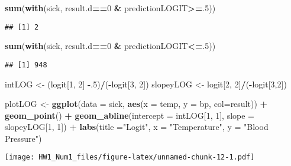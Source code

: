 \documentclass[]{article}
\newenvironment{Shaded}{\begin{snugshade}}{\end{snugshade}}
\newcommand{\KeywordTok}[1]{\textcolor[rgb]{0.13,0.29,0.53}{\textbf{#1}}}
\newcommand{\DataTypeTok}[1]{\textcolor[rgb]{0.13,0.29,0.53}{#1}}
\newcommand{\DecValTok}[1]{\textcolor[rgb]{0.00,0.00,0.81}{#1}}
\newcommand{\StringTok}[1]{\textcolor[rgb]{0.31,0.60,0.02}{#1}}
\newcommand{\OperatorTok}[1]{\textcolor[rgb]{0.81,0.36,0.00}{\textbf{#1}}}
\newcommand{\NormalTok}[1]{#1}
\begin{document}
\begin{Shaded}
\begin{Highlighting}[]
\KeywordTok{sum}\NormalTok{(}\KeywordTok{with}\NormalTok{(sick, result.d}\OperatorTok{==}\DecValTok{0} \OperatorTok{&}\StringTok{ }\NormalTok{predictionLOGIT}\OperatorTok{>=}\NormalTok{.}\DecValTok{5}\NormalTok{))}
\end{Highlighting}
\end{Shaded}

\begin{verbatim}
## [1] 2
\end{verbatim}

\begin{Shaded}
\begin{Highlighting}[]
\KeywordTok{sum}\NormalTok{(}\KeywordTok{with}\NormalTok{(sick, result.d}\OperatorTok{==}\DecValTok{0} \OperatorTok{&}\StringTok{ }\NormalTok{predictionLOGIT}\OperatorTok{<=}\NormalTok{.}\DecValTok{5}\NormalTok{))}
\end{Highlighting}
\end{Shaded}

\begin{verbatim}
## [1] 948
\end{verbatim}

\begin{Shaded}
\begin{Highlighting}[]
\NormalTok{intLOG <-}\StringTok{ }\NormalTok{(logit[}\DecValTok{1}\NormalTok{, }\DecValTok{2}\NormalTok{] }\OperatorTok{-}\NormalTok{.}\DecValTok{5}\NormalTok{)}\OperatorTok{/}\NormalTok{(}\OperatorTok{-}\NormalTok{logit[}\DecValTok{3}\NormalTok{, }\DecValTok{2}\NormalTok{]) }
\NormalTok{slopeyLOG <-}\StringTok{ }\NormalTok{logit[}\DecValTok{2}\NormalTok{, }\DecValTok{2}\NormalTok{]}\OperatorTok{/}\NormalTok{(}\OperatorTok{-}\NormalTok{logit[}\DecValTok{3}\NormalTok{,}\DecValTok{2}\NormalTok{])}
\end{Highlighting}
\end{Shaded}

\begin{Shaded}
\begin{Highlighting}[]
\NormalTok{plotLOG <-}\StringTok{ }\KeywordTok{ggplot}\NormalTok{(}\DataTypeTok{data =}\NormalTok{ sick, }\KeywordTok{aes}\NormalTok{(}\DataTypeTok{x =}\NormalTok{ temp, }\DataTypeTok{y =}\NormalTok{ bp, }\DataTypeTok{col=}\NormalTok{result)) }\OperatorTok{+}\StringTok{ }\KeywordTok{geom_point}\NormalTok{() }\OperatorTok{+}\StringTok{ }\KeywordTok{geom_abline}\NormalTok{(}\DataTypeTok{intercept =}\NormalTok{ intLOG[}\DecValTok{1}\NormalTok{, }\DecValTok{1}\NormalTok{], }\DataTypeTok{slope =}\NormalTok{ slopeyLOG[}\DecValTok{1}\NormalTok{, }\DecValTok{1}\NormalTok{]) }\OperatorTok{+}\StringTok{ }\KeywordTok{labs}\NormalTok{(}\DataTypeTok{title =}\StringTok{"Logit"}\NormalTok{, }\DataTypeTok{x =} \StringTok{"Temperature"}\NormalTok{, }\DataTypeTok{y =} \StringTok{"Blood Pressure"}\NormalTok{)}
\end{Highlighting}
\end{Shaded}

\texttt{[image: HW1\_Num1\_files/figure-latex/unnamed-chunk-12-1.pdf]}
\end{document}
